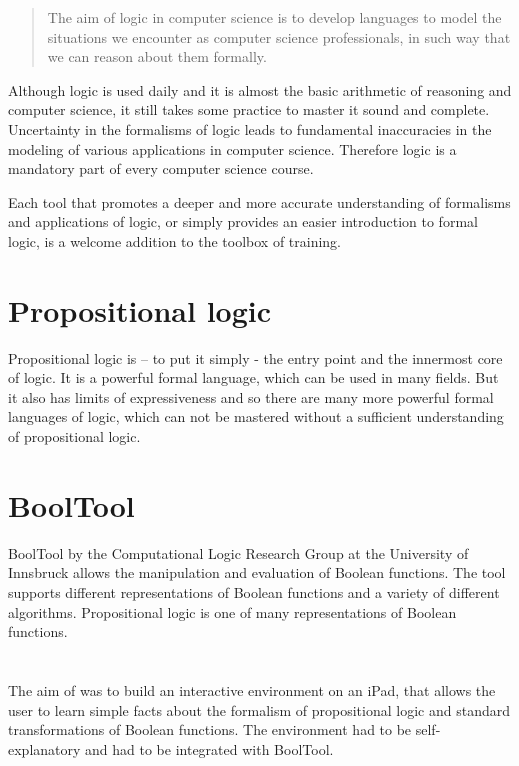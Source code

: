 
\begin{quote}
The aim of logic in computer science is to develop languages 
to model the situations we encounter as computer science professionals, 
in such way that we can reason about them formally. \cite{Huth:2004:LCS:975331}
\end{quote}

Although logic is used daily and it is almost the basic arithmetic of reasoning and computer science, 
it still takes some practice to master it sound and complete. 
Uncertainty in the formalisms of logic leads to fundamental inaccuracies 
in the modeling of various applications in computer science. 
Therefore logic is a mandatory part of every computer science course. 

Each tool that promotes a deeper and more accurate understanding of formalisms and applications of logic,
or simply provides an easier introduction to formal logic, 
is a welcome addition to the toolbox of training.

\section{Propositional logic}

Propositional logic is – to put it simply - the entry point and the innermost core of logic. 
It is a powerful formal language, which can be used in many fields. 
But it also has limits of expressiveness and so 
there are many more powerful formal languages of logic, 
which can not be mastered without a sufficient understanding  of propositional logic.

\section{BoolTool}

BoolTool by the Computational Logic Research Group at the University of Innsbruck allows the manipulation and evaluation of Boolean functions. The tool supports different representations of Boolean functions and a variety of different algorithms.
Propositional logic is one of many representations of Boolean functions.

\section{\Nyaya}

The aim of \Nyaya was to build an interactive environment on an iPad,
that allows the user to learn simple facts about the formalism of propositional logic 
and standard transformations of Boolean functions. 
The environment had to be self-explanatory and had to be integrated with BoolTool. 


%
